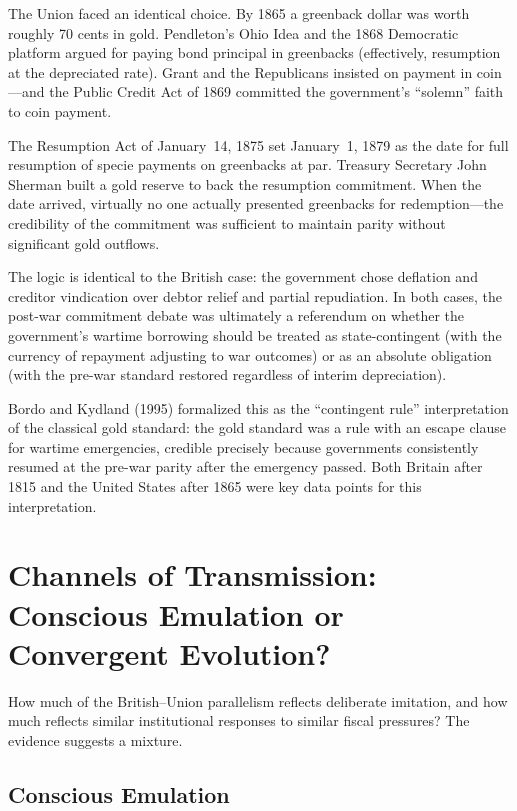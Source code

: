 \documentclass[12pt]{article}
\begin{document}
The Union faced an identical choice. By 1865 a greenback dollar was
worth roughly 70 cents in gold. Pendleton's Ohio Idea and the 1868
Democratic platform argued for paying bond principal in greenbacks
(effectively, resumption at the depreciated rate). Grant and the
Republicans insisted on payment in coin---and the Public Credit Act of
1869 committed the government's ``solemn'' faith to coin payment.

The Resumption Act of January~14, 1875 set January~1, 1879 as the date
for full resumption of specie payments on greenbacks at par. Treasury
Secretary John Sherman built a gold reserve to back the resumption
commitment. When the date arrived, virtually no one actually presented
greenbacks for redemption---the credibility of the commitment was
sufficient to maintain parity without significant gold outflows.

The logic is identical to the British case: the government chose
deflation and creditor vindication over debtor relief and partial
repudiation. In both cases, the post-war commitment debate was
ultimately a referendum on whether the government's wartime borrowing
should be treated as state-contingent (with the currency of repayment
adjusting to war outcomes) or as an absolute obligation (with the
pre-war standard restored regardless of interim depreciation).

Bordo and Kydland (1995) formalized this as the ``contingent rule''
interpretation of the classical gold standard: the gold standard was
a rule with an escape clause for wartime emergencies, credible precisely
because governments consistently resumed at the pre-war parity after
the emergency passed. Both Britain after 1815 and the United States
after 1865 were key data points for this interpretation.

\section{Channels of Transmission: Conscious Emulation or Convergent Evolution?}

How much of the British--Union parallelism reflects deliberate imitation,
and how much reflects similar institutional responses to similar fiscal
pressures? The evidence suggests a mixture.

\subsection{Conscious Emulation}
\end{document}
